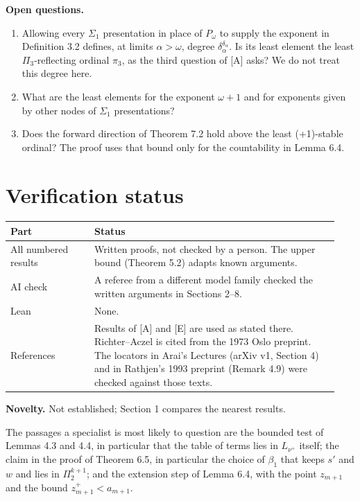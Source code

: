 \documentclass[11pt]{article}
\begin{document}
\textbf{Open questions.}
\begin{enumerate}
\item Allowing every $\Sigma_1$ presentation in place of $P_\omega$ to supply the exponent in Definition 3.2 defines,
  at limits $\alpha > \omega$, degree $\delta_\alpha^{\delta_\alpha}$. Is its least element the least $\Pi_3$-reflecting ordinal $\pi_3$, as the third
  question of [A] asks? We do not treat this degree here.
\item What are the least elements for the exponent $\omega + 1$ and for exponents given by other nodes of $\Sigma_1$
  presentations?
\item Does the forward direction of Theorem 7.2 hold above the least (+1)-stable ordinal? The proof uses that bound
  only for the
  countability in Lemma 6.4.
\end{enumerate}

\section{Verification status}

\begin{center}\begin{tabular}{p{0.24\linewidth}p{0.70\linewidth}}
\toprule
Part & Status \\
\midrule
All numbered results & Written proofs, not checked by a person. The upper bound (Theorem 5.2) adapts known arguments. \\
AI check & A referee from a different model family checked the written arguments in Sections 2--8. \\
Lean & None. \\
References & Results of [A] and [E] are used as stated there. Richter--Aczel is cited from the 1973 Oslo preprint. The
  locators in Arai's Lectures (arXiv v1, Section 4) and in Rathjen's 1993 preprint (Remark 4.9) were checked against
  those texts. \\
\bottomrule
\end{tabular}\end{center}

\textbf{Novelty.} Not established; Section 1 compares the nearest results.

The passages a specialist is most likely to question are the bounded test of Lemmas 4.3 and 4.4, in particular that the
table of terms lies in $L_{\nu^+}$ itself; the claim in the proof of Theorem 6.5, in particular the choice of
$\beta_1$ that keeps $s'$ and $w$ and lies in $\Pi_2^{k+1}$; and the extension step of Lemma 6.4, with the point
$z_{m+1}$ and the bound $z_{m+1}^+ < a_{m+1}$.
\end{document}
